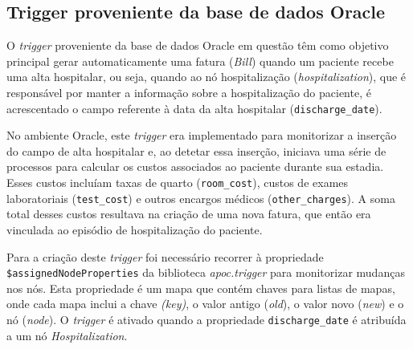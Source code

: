 \subsection{Trigger proveniente da base de dados Oracle}

O \textit{trigger} proveniente da base de dados Oracle em questão têm como objetivo principal gerar automaticamente uma fatura (\textit{Bill}) quando um paciente recebe uma alta hospitalar, ou seja, quando ao nó hospitalização (\textit{hospitalization}), que é responsável por manter a informação sobre a hospitalização do paciente, é acrescentado o campo referente à data da alta hospitalar (\texttt{discharge\_date}). 

No ambiente Oracle, este \textit{trigger} era implementado para monitorizar a inserção do campo de alta hospitalar e, ao detetar essa inserção, iniciava uma série de processos para calcular os custos associados ao paciente durante sua estadia. Esses custos incluíam taxas de quarto (\texttt{room\_cost}), custos de exames laboratoriais (\texttt{test\_cost}) e outros encargos médicos (\texttt{other\_charges}). A soma total desses custos resultava na criação de uma nova fatura, que então era vinculada ao episódio de hospitalização do paciente.

Para a criação deste \textit{trigger} foi necessário recorrer à propriedade \texttt{\$assignedNodeProperties} da biblioteca \textit{apoc.trigger} para monitorizar mudanças nos nós. Esta propriedade é um mapa que contém chaves para listas de mapas, onde cada mapa inclui a chave \textit{(key)}, o valor antigo (\textit{old}), o valor novo (\textit{new}) e o nó (\textit{node}). O \textit{trigger} é ativado quando a propriedade \texttt{discharge\_date} é atribuída a um nó \textit{Hospitalization}.

